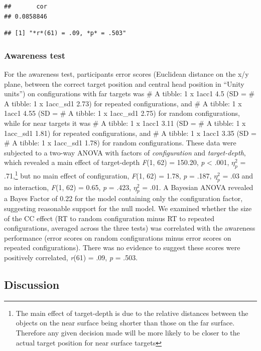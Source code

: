 \documentclass[
  english,
  man,floatsintext]{apa7}
\begin{document}
\begin{verbatim}
##       cor 
## 0.0858846
\end{verbatim}

\begin{verbatim}
## [1] "*r*(61) = .09, *p* = .503"
\end{verbatim}

\hypertarget{awareness-test}{%
\subsubsection{Awareness test}\label{awareness-test}}

For the awareness test, participants error scores (Euclidean distance on the x/y plane, between the correct target position and central head position in ``Unity units'') on configurations with far targets was \# A tibble: 1 x 1acc1 4.5 (SD = \# A tibble: 1 x 1acc\_sd1 2.73) for repeated configurations, and \# A tibble: 1 x 1acc1 4.55 (SD = \# A tibble: 1 x 1acc\_sd1 2.75) for random configurations, while for near targets it was \# A tibble: 1 x 1acc1 3.11 (SD = \# A tibble: 1 x 1acc\_sd1 1.81) for repeated configurations, and \# A tibble: 1 x 1acc1 3.35 (SD = \# A tibble: 1 x 1acc\_sd1 1.78) for random configurations. These data were subjected to a two-way ANOVA with factors of \emph{configuration} and \emph{target-depth}, which revealed a main effect of target-depth \emph{F}(1, 62) = 150.20, \emph{p} \textless{} .001, \(\eta^2_p\) = .71,\footnote{The main effect of target-depth is due to the relative distances between the objects on the near surface being shorter than those on the far surface. Therefore any given decision made will be more likely to be closer to the actual target position for near surface targets} but no main effect of configuration, \emph{F}(1, 62) = 1.78, \emph{p} = .187, \(\eta^2_p\) = .03 and no interaction, \emph{F}(1, 62) = 0.65, \emph{p} = .423, \(\eta^2_p\) = .01. A Bayesian ANOVA revealed a Bayes Factor of 0.22 for the model containing only the configuration factor, suggesting reasonable support for the null model. We examined whether the size of the CC effect (RT to random configuration minus RT to repeated configurations, averaged across the three tests) was correlated with the awareness performance (error scores on random configurations minus error scores on repeated configurations). There was no evidence to suggest these scores were positively correlated, \emph{r}(61) = .09, \emph{p} = .503.

\hypertarget{discussion-1}{%
\subsection{Discussion}\label{discussion-1}}
\end{document}

